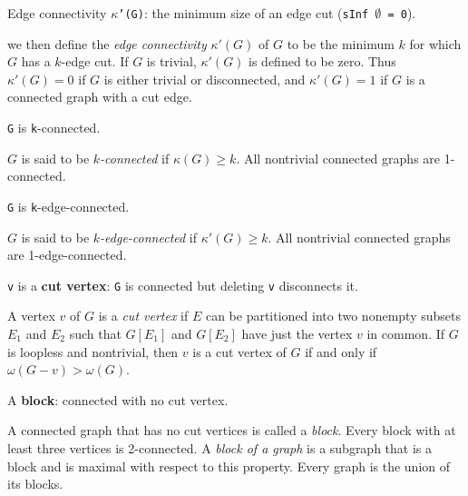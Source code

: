 \begin{definition}[Edge connectivity $\kappa'(G)$: the minimum size of an edge cut (\texttt{sInf $\emptyset$ = 0})]
\label{SimpleGraph.edgeConnectivity}
\leanok
{}
Edge connectivity \texttt{$\kappa$'(G)}: the minimum size of an edge cut (\texttt{sInf
$\emptyset$ = 0}).

we then define the \emph{edge connectivity} $\kappa'(G)$ of $G$ to be the minimum $k$
for which $G$ has a $k$-edge cut. If $G$ is trivial, $\kappa'(G)$ is defined to be zero.
Thus $\kappa'(G) = 0$ if $G$ is either trivial or disconnected, and $\kappa'(G) = 1$ if
$G$ is a connected graph with a cut edge.
\end{definition}

\begin{definition}[$G$ is $k$-connected]
\label{SimpleGraph.IsKConnected}
\leanok
{}
\texttt{G} is \texttt{k}-connected.

$G$ is said to be \emph{$k$-connected} if $\kappa(G) \geq k$. All nontrivial connected
graphs are 1-connected.
\end{definition}

\begin{definition}
\label{SimpleGraph.IsKEdgeConnected}
\leanok
{}
\texttt{G} is \texttt{k}-edge-connected.

$G$ is said to be \emph{$k$-edge-connected} if $\kappa'(G) \geq k$. All nontrivial
connected graphs are 1-edge-connected.
\end{definition}

\begin{definition}
\label{SimpleGraph.IsCutVertex}
\leanok
\texttt{v} is a \textbf{cut vertex}: \texttt{G} is connected but deleting \texttt{v} disconnects it.

A vertex $v$ of $G$ is a \emph{cut vertex} if $E$ can be partitioned into two nonempty
subsets $E_1$ and $E_2$ such that $G[E_1]$ and $G[E_2]$ have just the vertex $v$ in
common. If $G$ is loopless and nontrivial, then $v$ is a cut vertex of $G$ if and only
if $\omega(G - v) > \omega(G)$.
\end{definition}

\begin{definition}
\label{SimpleGraph.IsBlock}
\leanok
{}
A \textbf{block}: connected with no cut vertex.

A connected graph that has no cut vertices is called a \emph{block}. Every block with at
least three vertices is 2-connected. A \emph{block of a graph} is a subgraph that is a
block and is maximal with respect to this property. Every graph is the union of its
blocks.
\end{definition}

